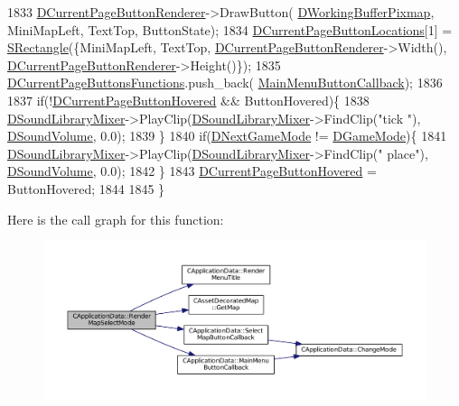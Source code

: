 \begin{DoxyCode}
1833     \hyperlink{classCApplicationData_abfe1743f2634b069ccc811db4a8733a8}{DCurrentPageButtonRenderer}->DrawButton(
      \hyperlink{classCApplicationData_afa34cf2780f38dd28c0c811e69d60a97}{DWorkingBufferPixmap}, MiniMapLeft, TextTop, ButtonState);
1834     \hyperlink{classCApplicationData_a3615df8e23cea3ce17f11cf61340a7b4}{DCurrentPageButtonLocations}[1] = \hyperlink{structSRectangle}{SRectangle}(\{MiniMapLeft, TextTop,
       \hyperlink{classCApplicationData_abfe1743f2634b069ccc811db4a8733a8}{DCurrentPageButtonRenderer}->Width(), 
      \hyperlink{classCApplicationData_abfe1743f2634b069ccc811db4a8733a8}{DCurrentPageButtonRenderer}->Height()\});
1835     \hyperlink{classCApplicationData_ad3079e5563a19d21c1e4ceff2a188382}{DCurrentPageButtonsFunctions}.push\_back(
      \hyperlink{classCApplicationData_a4410839118b5b74dab798ad7be6f703b}{MainMenuButtonCallback});
1836     
1837     \textcolor{keywordflow}{if}(!\hyperlink{classCApplicationData_a96b3a9b5c9965540007dff3fa85587fa}{DCurrentPageButtonHovered} && ButtonHovered)\{
1838         \hyperlink{classCApplicationData_aa1e6876121bb4fb229ec6b930a8a6766}{DSoundLibraryMixer}->PlayClip(\hyperlink{classCApplicationData_aa1e6876121bb4fb229ec6b930a8a6766}{DSoundLibraryMixer}->FindClip(\textcolor{stringliteral}{"tick
      "}), \hyperlink{classCApplicationData_aa6e540f860dcb1929ef36ddce3be3691}{DSoundVolume}, 0.0);
1839     \}
1840     \textcolor{keywordflow}{if}(\hyperlink{classCApplicationData_a3b67edeacd70201dcf96fa9fa8aa2107}{DNextGameMode} != \hyperlink{classCApplicationData_a2f906f2b4208ecb2a057e6b62e549685}{DGameMode})\{
1841         \hyperlink{classCApplicationData_aa1e6876121bb4fb229ec6b930a8a6766}{DSoundLibraryMixer}->PlayClip(\hyperlink{classCApplicationData_aa1e6876121bb4fb229ec6b930a8a6766}{DSoundLibraryMixer}->FindClip(\textcolor{stringliteral}{"
      place"}), \hyperlink{classCApplicationData_aa6e540f860dcb1929ef36ddce3be3691}{DSoundVolume}, 0.0);
1842     \}
1843     \hyperlink{classCApplicationData_a96b3a9b5c9965540007dff3fa85587fa}{DCurrentPageButtonHovered} = ButtonHovered;
1844 
1845 \}
\end{DoxyCode}
Here is the call graph for this function\+:
\nopagebreak
\begin{figure}[H]
\begin{center}
\leavevmode
\includegraphics[width=350pt]{classCApplicationData_a72fff3a266be49b3e9f323dcfe545923_cgraph}
\end{center}
\end{figure}
